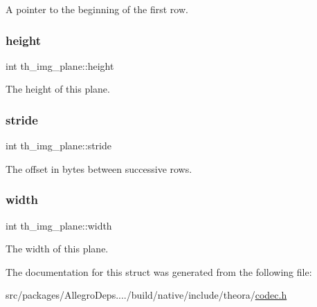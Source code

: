 A pointer to the beginning of the first row. \mbox{\label{structth__img__plane_a21aea1367894468de489d529d7eaf44d}} 
\subsubsection{\texorpdfstring{height}{height}}
{\footnotesize\ttfamily int th\+\_\+img\+\_\+plane\+::height}

The height of this plane. \mbox{\label{structth__img__plane_ab1100f071ffee3b37e07e3222f819bad}} 
\subsubsection{\texorpdfstring{stride}{stride}}
{\footnotesize\ttfamily int th\+\_\+img\+\_\+plane\+::stride}

The offset in bytes between successive rows. \mbox{\label{structth__img__plane_a58cc297a99cd4594c3d30e56f2ed6b74}} 
\subsubsection{\texorpdfstring{width}{width}}
{\footnotesize\ttfamily int th\+\_\+img\+\_\+plane\+::width}

The width of this plane. 

The documentation for this struct was generated from the following file\+:\begin{DoxyCompactItemize}
\item 
src/packages/\+Allegro\+Deps..../build/native/include/theora/\hyperlink{theora_2codec_8h}{codec.\+h}\end{DoxyCompactItemize}
